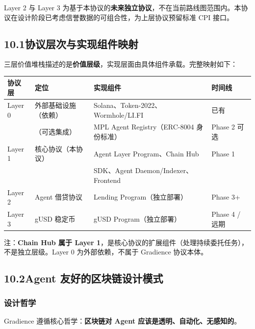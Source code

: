 \documentclass[11pt,a4paper]{article}
\begin{document}
Layer 2 与 Layer 3 为基于本协议的\textbf{未来独立协议}，不在当前路线图范围内。本协议在设计阶段已考虑信誉数据的可组合性，为上层协议预留标准 CPI 接口。

\subsection*{10.1\quad 协议层次与实现组件映射}

三层价值堆栈描述的是\textbf{价值层级}，实现层面由具体组件承载。完整映射如下：

\begin{center}
\renewcommand{\arraystretch}{1.3}
\begin{tabular}{llll}
\hline
\textbf{协议层} & \textbf{定位} & \textbf{实现组件} & \textbf{时间线} \\
\hline
Layer 0 & 外部基础设施（依赖） & Solana、Token-2022、Wormhole/LI.FI & 已有 \\
        & （可选集成） & MPL Agent Registry（ERC-8004 身份标准） & Phase 2 可选 \\
Layer 1 & 核心协议（本协议） & Agent Layer Program、Chain Hub & Phase 1 \\
        & & SDK、Agent Daemon/Indexer、Frontend & \\
Layer 2 & Agent 借贷协议 & Lending Program（独立部署） & Phase 3+ \\
Layer 3 & gUSD 稳定币 & gUSD Program（独立部署） & Phase 4 / 远期 \\
\hline
\end{tabular}
\end{center}

注：\textbf{Chain Hub 属于 Layer 1}，是核心协议的扩展组件（处理持续委托任务），不是独立层级。Layer 0 为外部依赖，不属于 Gradience 协议本体。

\subsection{10.2\quad Agent 友好的区块链设计模式}

\subsubsection{设计哲学}

Gradience 遵循核心哲学：\textbf{区块链对 Agent 应该是透明、自动化、无感知的}。

\begin{center}
\end{center}
\end{document}
